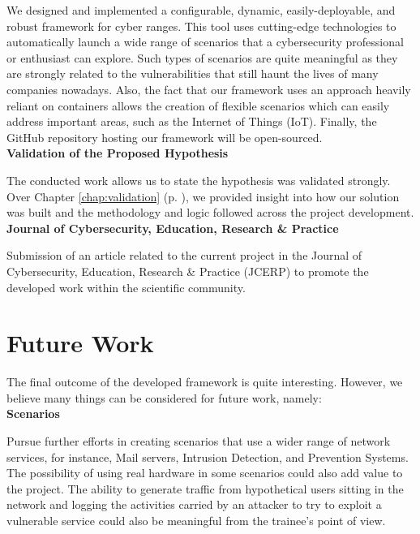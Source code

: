We designed and implemented a configurable, dynamic, easily-deployable, and robust framework for cyber ranges. This tool uses cutting-edge technologies to automatically launch a wide range of scenarios that a cybersecurity professional or enthusiast can explore. Such types of scenarios are quite meaningful as they are strongly related to the vulnerabilities that still haunt the lives of many companies nowadays. Also, the fact that our framework uses an approach heavily reliant on containers allows the creation of flexible scenarios which can easily address important areas, such as the Internet of Things (IoT). Finally, the GitHub repository hosting our framework will be open-sourced.\\

\textbf{Validation of the Proposed Hypothesis}

The conducted work allows us to state the hypothesis was validated strongly. Over Chapter \ref{chap:validation} (p. \pageref{chap:validation}), we provided insight into how our solution was built and the methodology and logic followed across the project development.\\

\textbf{Journal of Cybersecurity, Education, Research \& Practice}

Submission of an article related to the current project in the Journal of Cybersecurity, Education, Research \& Practice (JCERP) to promote the developed work within the scientific community. 

\section{Future Work} \label{sec:future_work}

The final outcome of the developed framework is quite interesting. However, we believe many things can be considered for future work, namely:\\

\textbf{Scenarios}

Pursue further efforts in creating scenarios that use a wider range of network services, for instance, Mail servers, Intrusion Detection, and Prevention Systems. The possibility of using real hardware in some scenarios could also add value to the project. The ability to generate traffic from hypothetical users sitting in the network and logging the activities carried by an attacker to try to exploit a vulnerable service could also be meaningful from the trainee's point of view.\\

